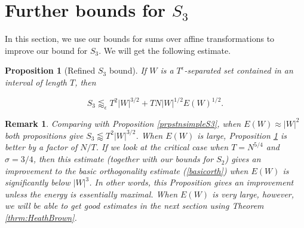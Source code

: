 \documentclass{amsart}
\theoremstyle{plain}
\newtheorem{prpstn}[thrm]{Proposition}
\newtheorem*{rmk}{Remark}
\numberwithin{equation}{section}
\begin{document}
%
%
%
%
 

\section{Further bounds for \texorpdfstring{$S_3$}{S3}}

In this section,  we use our bounds for sums over affine transformations to improve our bound for $S_3$.   We will get the following estimate.

%
%


\begin{prpstn}[Refined $S_3$ bound] \label{prpstnS3} If $W$ is a $T^\epsilon$-separated set contained in an interval of length $T$,  then


\begin{equation}
S_{3} \lessapprox_\epsilon T^2 |W|^{3/2}+TN|W|^{1/2}E(W)^{1/2}.
\label{eq:S3DirichletBound}
\end{equation}

\end{prpstn}

%
%

\begin{rmk}
Comparing with Proposition \ref{prpstnsimpleS3},  when $E(W) \approx |W|^2$ both propositions give $S_3 \lessapprox T^2 |W|^{3/2}$.  When $E(W)$ is large,  Proposition \ref{prpstnS3} is better by a factor of $N/T$.  If we look at the critical case when $T = N^{5/4}$ and $\sigma = 3/4$, then this estimate (together with our bounds for $S_2$) gives an improvement to the basic orthogonality estimate (\ref{basicorth}) when $E(W)$ is significantly below $|W|^{3}$.  In other words, this Proposition gives an improvement unless the energy is essentially maximal.  When $E(W)$ is very large, however, we will be able to get good estimates in the next section using Theorem \ref{thrm:HeathBrown}. 
\end{rmk}
\end{document}
